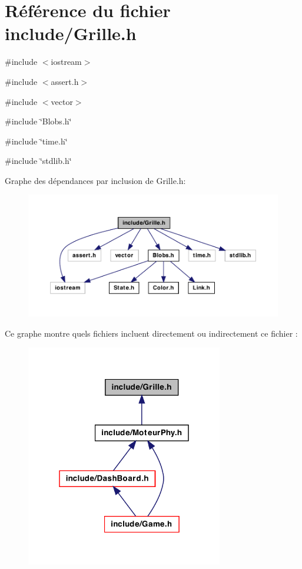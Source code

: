 \hypertarget{a00026}{
\section{Référence du fichier include/Grille.h}
\label{a00026}
}
{\ttfamily \#include $<$iostream$>$}\par
{\ttfamily \#include $<$assert.h$>$}\par
{\ttfamily \#include $<$vector$>$}\par
{\ttfamily \#include \char`\"{}Blobs.h\char`\"{}}\par
{\ttfamily \#include \char`\"{}time.h\char`\"{}}\par
{\ttfamily \#include \char`\"{}stdlib.h\char`\"{}}\par
Graphe des dépendances par inclusion de Grille.h:
\nopagebreak
\begin{figure}[H]
\begin{center}
\leavevmode
\includegraphics[width=400pt]{a00054}
\end{center}
\end{figure}
Ce graphe montre quels fichiers incluent directement ou indirectement ce fichier :
\nopagebreak
\begin{figure}[H]
\begin{center}
\leavevmode
\includegraphics[width=244pt]{a00055}
\end{center}
\end{figure}

